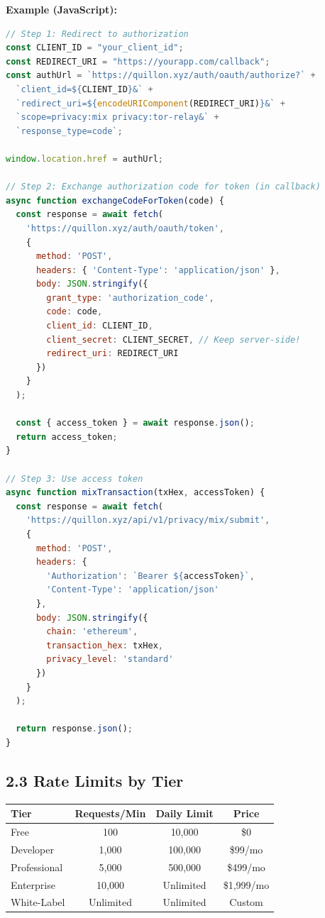 \documentclass[11pt,a4paper]{article}
\begin{document}
\textbf{Example (JavaScript):}
\begin{lstlisting}[language=JavaScript]
// Step 1: Redirect to authorization
const CLIENT_ID = "your_client_id";
const REDIRECT_URI = "https://yourapp.com/callback";
const authUrl = `https://quillon.xyz/auth/oauth/authorize?` +
  `client_id=${CLIENT_ID}&` +
  `redirect_uri=${encodeURIComponent(REDIRECT_URI)}&` +
  `scope=privacy:mix privacy:tor-relay&` +
  `response_type=code`;

window.location.href = authUrl;

// Step 2: Exchange authorization code for token (in callback)
async function exchangeCodeForToken(code) {
  const response = await fetch(
    'https://quillon.xyz/auth/oauth/token',
    {
      method: 'POST',
      headers: { 'Content-Type': 'application/json' },
      body: JSON.stringify({
        grant_type: 'authorization_code',
        code: code,
        client_id: CLIENT_ID,
        client_secret: CLIENT_SECRET, // Keep server-side!
        redirect_uri: REDIRECT_URI
      })
    }
  );

  const { access_token } = await response.json();
  return access_token;
}

// Step 3: Use access token
async function mixTransaction(txHex, accessToken) {
  const response = await fetch(
    'https://quillon.xyz/api/v1/privacy/mix/submit',
    {
      method: 'POST',
      headers: {
        'Authorization': `Bearer ${accessToken}`,
        'Content-Type': 'application/json'
      },
      body: JSON.stringify({
        chain: 'ethereum',
        transaction_hex: txHex,
        privacy_level: 'standard'
      })
    }
  );

  return response.json();
}
\end{lstlisting}

\subsection{2.3 Rate Limits by Tier}

\begin{table}[h]
\centering
\begin{tabular}{lccc}
\toprule
\textbf{Tier} & \textbf{Requests/Min} & \textbf{Daily Limit} & \textbf{Price} \\
\midrule
Free & 100 & 10,000 & \$0 \\
Developer & 1,000 & 100,000 & \$99/mo \\
Professional & 5,000 & 500,000 & \$499/mo \\
Enterprise & 10,000 & Unlimited & \$1,999/mo \\
White-Label & Unlimited & Unlimited & Custom \\
\bottomrule
\end{tabular}
\end{table}
\end{document}
